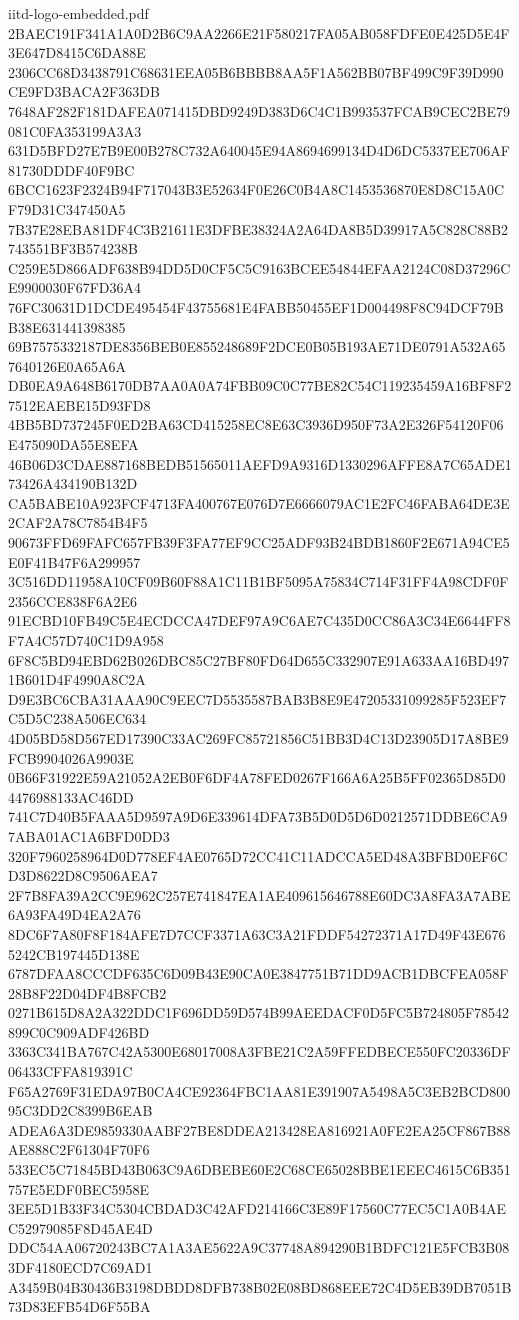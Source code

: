 \begin{filecontents*}[overwrite]{iitd-logo-embedded.pdf}
2BAEC191F341A1A0D2B6C9AA2266E21F580217FA05AB058FDFE0E425D5E4F3E647D8415C6DA88E
2306CC68D3438791C68631EEA05B6BBBB8AA5F1A562BB07BF499C9F39D990CE9FD3BACA2F363DB
7648AF282F181DAFEA071415DBD9249D383D6C4C1B993537FCAB9CEC2BE79081C0FA353199A3A3
631D5BFD27E7B9E00B278C732A640045E94A8694699134D4D6DC5337EE706AF81730DDDF40F9BC
6BCC1623F2324B94F717043B3E52634F0E26C0B4A8C1453536870E8D8C15A0CF79D31C347450A5
7B37E28EBA81DF4C3B21611E3DFBE38324A2A64DA8B5D39917A5C828C88B2743551BF3B574238B
C259E5D866ADF638B94DD5D0CF5C5C9163BCEE54844EFAA2124C08D37296CE9900030F67FD36A4
76FC30631D1DCDE495454F43755681E4FABB50455EF1D004498F8C94DCF79BB38E631441398385
69B7575332187DE8356BEB0E855248689F2DCE0B05B193AE71DE0791A532A657640126E0A65A6A
DB0EA9A648B6170DB7AA0A0A74FBB09C0C77BE82C54C119235459A16BF8F27512EAEBE15D93FD8
4BB5BD737245F0ED2BA63CD415258EC8E63C3936D950F73A2E326F54120F06E475090DA55E8EFA
46B06D3CDAE887168BEDB51565011AEFD9A9316D1330296AFFE8A7C65ADE173426A434190B132D
CA5BABE10A923FCF4713FA400767E076D7E6666079AC1E2FC46FABA64DE3E2CAF2A78C7854B4F5
90673FFD69FAFC657FB39F3FA77EF9CC25ADF93B24BDB1860F2E671A94CE5E0F41B47F6A299957
3C516DD11958A10CF09B60F88A1C11B1BF5095A75834C714F31FF4A98CDF0F2356CCE838F6A2E6
91ECBD10FB49C5E4ECDCCA47DEF97A9C6AE7C435D0CC86A3C34E6644FF8F7A4C57D740C1D9A958
6F8C5BD94EBD62B026DBC85C27BF80FD64D655C332907E91A633AA16BD4971B601D4F4990A8C2A
D9E3BC6CBA31AAA90C9EEC7D5535587BAB3B8E9E47205331099285F523EF7C5D5C238A506EC634
4D05BD58D567ED17390C33AC269FC85721856C51BB3D4C13D23905D17A8BE9FCB9904026A9903E
0B66F31922E59A21052A2EB0F6DF4A78FED0267F166A6A25B5FF02365D85D04476988133AC46DD
741C7D40B5FAAA5D9597A9D6E339614DFA73B5D0D5D6D0212571DDBE6CA97ABA01AC1A6BFD0DD3
320F7960258964D0D778EF4AE0765D72CC41C11ADCCA5ED48A3BFBD0EF6CD3D8622D8C9506AEA7
2F7B8FA39A2CC9E962C257E741847EA1AE409615646788E60DC3A8FA3A7ABE6A93FA49D4EA2A76
8DC6F7A80F8F184AFE7D7CCF3371A63C3A21FDDF54272371A17D49F43E6765242CB197445D138E
6787DFAA8CCCDF635C6D09B43E90CA0E3847751B71DD9ACB1DBCFEA058F28B8F22D04DF4B8FCB2
0271B615D8A2A322DDC1F696DD59D574B99AEEDACF0D5FC5B724805F78542899C0C909ADF426BD
3363C341BA767C42A5300E68017008A3FBE21C2A59FFEDBECE550FC20336DF06433CFFA819391C
F65A2769F31EDA97B0CA4CE92364FBC1AA81E391907A5498A5C3EB2BCD80095C3DD2C8399B6EAB
ADEA6A3DE9859330AABF27BE8DDEA213428EA816921A0FE2EA25CF867B88AE888C2F61304F70F6
533EC5C71845BD43B063C9A6DBEBE60E2C68CE65028BBE1EEEC4615C6B351757E5EDF0BEC5958E
3EE5D1B33F34C5304CBDAD3C42AFD214166C3E89F17560C77EC5C1A0B4AEC52979085F8D45AE4D
DDC54AA06720243BC7A1A3AE5622A9C37748A894290B1BDFC121E5FCB3B083DF4180ECD7C69AD1
A3459B04B30436B3198DBDD8DFB738B02E08BD868EEE72C4D5EB39DB7051B73D83EFB54D6F55BA

\end{filecontents*}
